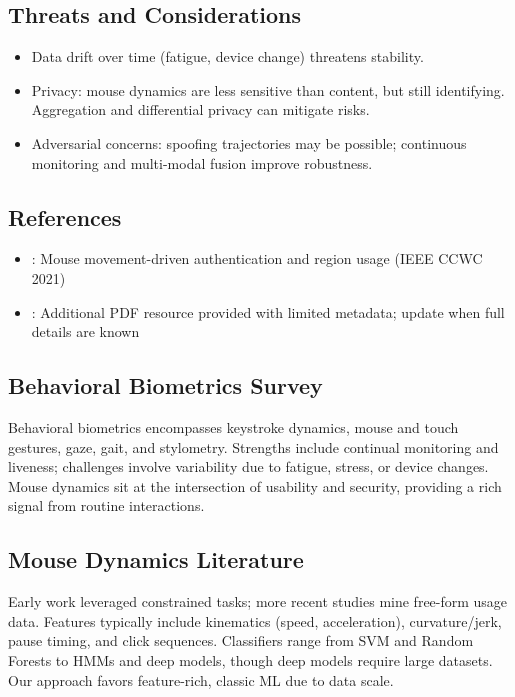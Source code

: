 \documentclass[
  12pt,
]{article}
\providecommand{\tightlist}{%
  \setlength{\itemsep}{0pt}\setlength{\parskip}{0pt}}
\begin{document}
\subsection{Threats and
Considerations}\label{threats-and-considerations}

\begin{itemize}
\tightlist
\item
  Data drift over time (fatigue, device change) threatens stability.
\item
  Privacy: mouse dynamics are less sensitive than content, but still
  identifying. Aggregation and differential privacy can mitigate risks.
\item
  Adversarial concerns: spoofing trajectories may be possible;
  continuous monitoring and multi-modal fusion improve robustness.
\end{itemize}

\subsection{References}\label{references}

\begin{itemize}
\tightlist
\item
  \cite{rahman2021}: Mouse movement-driven authentication and region
  usage (IEEE CCWC 2021)
\item
  \cite{paper_document}: Additional PDF resource provided with limited
  metadata; update when full details are known
\end{itemize}

\subsection{Behavioral Biometrics
Survey}\label{behavioral-biometrics-survey}

Behavioral biometrics encompasses keystroke dynamics, mouse and touch
gestures, gaze, gait, and stylometry. Strengths include continual
monitoring and liveness; challenges involve variability due to fatigue,
stress, or device changes. Mouse dynamics sit at the intersection of
usability and security, providing a rich signal from routine
interactions.

\subsection{Mouse Dynamics Literature}\label{mouse-dynamics-literature}

Early work leveraged constrained tasks; more recent studies mine
free-form usage data. Features typically include kinematics (speed,
acceleration), curvature/jerk, pause timing, and click sequences.
Classifiers range from SVM and Random Forests to HMMs and deep models,
though deep models require large datasets. Our approach favors
feature-rich, classic ML due to data scale.
\end{document}
